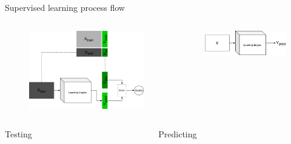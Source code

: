 \begin{frame}{Supervised learning process flow}
	\begin{columns}
		\begin{column}{.5\textwidth}
			\begin{figure}
				\includegraphics[width=1.\textwidth, center]{figures/ml_1_test}
				\caption*{}
			\end{figure}
		\end{column}
		\begin{column}{.5\textwidth}
			\begin{figure}
				\includegraphics[width=1.\textwidth, center]{figures/ml_1_infer}
				\caption*{}
			\end{figure}
		\end{column}
	\end{columns}
	\begin{columns}
		\begin{column}{.5\textwidth}
			\begin{center}
				Testing
			\end{center}
		\end{column}
		\begin{column}{.5\textwidth}
			\begin{center}
				Predicting
			\end{center}
		\end{column}
	\end{columns}
\end{frame}


